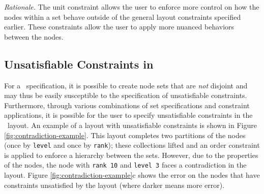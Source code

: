 
\emph{Rationale.} The unit constraint allows the user to enforce more
control on how the nodes within a set behave outside of the general layout
constraints specified earlier. These constraints allow the user to apply
more nuanced behaviors between the nodes.

\subsection{Unsatisfiable Constraints in \projectname}
For a \projectname\ specification, it is possible to create node sets that
are \emph{not} disjoint and may thus be easily susceptible to the
specification of unsatisfiable constraints. Furthermore, through various
combinations of set specifications and constraint applications, it is
possible for the user to specify unsatisfiable constraints in the
\projectname\ layout. An example of a layout with unsatisfiable constraints
is shown in Figure \ref{fig:contradiction-example}. This layout completes
two partitions of the nodes (once by \texttt{level} and once by
\texttt{rank}); these collections lifted and an order constraint is applied
to enforce a hierarchy between the sets. However, due to the properties of
the nodes, the node with \texttt{rank 10} and \texttt{level 3} faces a
contradiction in the layout. Figure \ref{fig:contradiction-example}c shows
the error on the nodes that have constraints unsatisfied by the layout
(where darker means more error).

